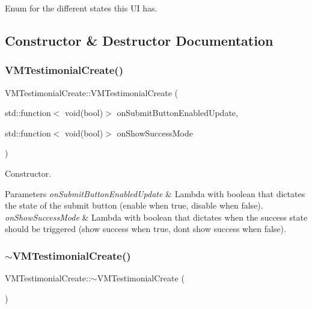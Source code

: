 Enum for the different states this UI has. 



\subsection{Constructor \& Destructor Documentation}
\mbox{\label{class_v_m_testimonial_create_a470df2e99d49a1e312a4cacf7bb5c1c5}} 
\subsubsection{\texorpdfstring{VMTestimonialCreate()}{VMTestimonialCreate()}}
{\footnotesize\ttfamily V\+M\+Testimonial\+Create\+::\+V\+M\+Testimonial\+Create (\begin{DoxyParamCaption}\item[{std\+::function$<$ void(bool)$>$}]{on\+Submit\+Button\+Enabled\+Update,  }\item[{std\+::function$<$ void(bool)$>$}]{on\+Show\+Success\+Mode }\end{DoxyParamCaption})}



Constructor. 


\begin{DoxyParams}{Parameters}
{\em on\+Submit\+Button\+Enabled\+Update} & Lambda with boolean that dictates the state of the submit button (enable when true, disable when false). \\
\hline
{\em on\+Show\+Success\+Mode} & Lambda with boolean that dictates when the success state should be triggered (show success when true, don\textquotesingle{}t show success when false). \\
\hline
\end{DoxyParams}
\mbox{\label{class_v_m_testimonial_create_a1031e0c42f0e86df90626123ebfceb8e}} 
\subsubsection{\texorpdfstring{$\sim$VMTestimonialCreate()}{~VMTestimonialCreate()}}
{\footnotesize\ttfamily V\+M\+Testimonial\+Create\+::$\sim$\+V\+M\+Testimonial\+Create (\begin{DoxyParamCaption}{ }\end{DoxyParamCaption})}



